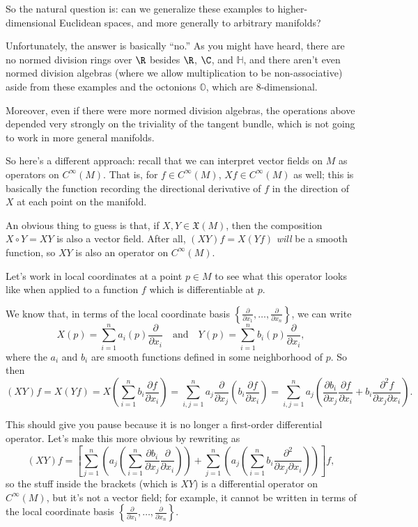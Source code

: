 So the natural question is: can we generalize these examples to higher-dimensional Euclidean spaces, and more generally to arbitrary manifolds?

Unfortunately, the answer is basically ``no.'' As you might have heard, there are no normed division rings over $\R$ besides $\R$, $\C$, and $\mathbb{H}$, and there aren't even normed division algebras (where we allow multiplication to be non-associative) aside from these examples and the octonions $\mathbb{O}$, which are 8-dimensional. 

Moreover, even if there were more normed division algebras, the operations above depended very strongly on the triviality of the tangent bundle, which is not going to work in more general manifolds.

So here's a different approach: recall that we can interpret vector fields on $M$ as operators on $C^\infty(M)$. That is, for $f \in C^\infty(M)$, $Xf \in C^\infty(M)$ as well; this is basically the function recording the directional derivative of $f$ in the direction of $X$ at each point on the manifold.

An obvious thing to guess is that, if $X,Y \in \mathfrak{X}(M)$, then the composition $X \circ Y = XY$ is also a vector field. After all, $(XY)f = X(Yf)$ \emph{will} be a smooth function, so $XY$ is also an operator on $C^\infty(M)$.

Let's work in local coordinates at a point $p \in M$ to see what this operator looks like when applied to a function $f$ which is differentiable at $p$.

We know that, in terms of the local coordinate basis $\left\{ \frac{\partial}{\partial x_1},\dots , \frac{\partial}{\partial x_n}\right\}$, we can write
\[
	X(p) = \sum_{i=1}^n a_i(p) \frac{\partial}{\partial x_i} \quad \text{and} \quad Y(p) = \sum_{i=1}^n b_i(p) \frac{\partial}{\partial x_i},
\]
where the $a_i$ and $b_i$ are smooth functions defined in some neighborhood of $p$. So then
\[
	(XY)f = X(Yf) = X\left(\sum_{i=1}^n b_i \frac{\partial f}{\partial x_i}\right) = \sum_{i,j=1}^n a_j \frac{\partial}{\partial x_j} \left( b_i \frac{\partial f}{\partial x_i}\right) = \sum_{i,j=1}^n a_j \left( \frac{\partial b_i}{\partial x_j}\frac{\partial f}{\partial x_i} + b_i \frac{\partial^2 f}{\partial x_j \partial x_i}\right).
\]

This should give you pause because it is no longer a first-order differential operator. Let's make this more obvious by rewriting as
\begin{equation}\label{eq:product of vector fields}
	(XY)f = \left[ \sum_{j=1}^n \left(a_j \left( \sum_{i=1}^n \frac{\partial b_i}{\partial x_j} \frac{\partial}{\partial x_i}\right)\right) + \sum_{j=1}^n \left(a_j \left(\sum_{i=1}^n b_i \frac{\partial^2}{\partial x_j \partial x_i}\right)\right)\right]f,
\end{equation}
so the stuff inside the brackets (which is $XY$) is a differential operator on $C^\infty(M)$, but it's not a vector field; for example, it cannot be written in terms of the local coordinate basis $\left\{ \frac{\partial}{\partial x_1}, \dots , \frac{\partial}{\partial x_n}\right\}$.

